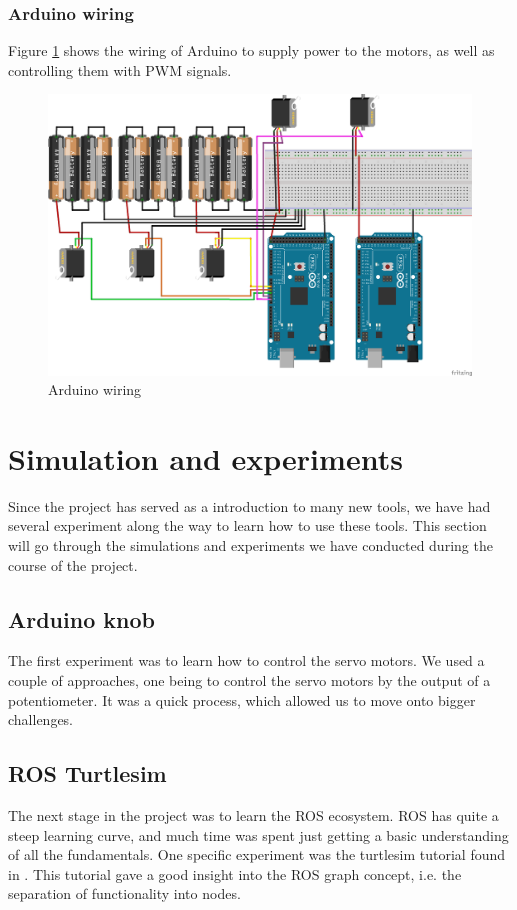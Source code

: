\documentclass[11pt,a4paper, titlepage]{article}
\begin{document}
\newpage
	\subsubsection{Arduino wiring}
	Figure \ref{fig:wiring} shows the wiring of Arduino to supply power to the motors, as well as controlling them with PWM signals.
	
	\begin{figure}[H]
		\centering
		\includegraphics[width=0.8\linewidth]{../Diagrams/Wiring.png}
		\caption{Arduino wiring}
		\label{fig:wiring}
	\end{figure}
	
		
\newpage
	\section{Simulation and experiments}
	\label{simex}
	Since the project has served as a introduction to many new tools, we have had several experiment along the way to learn how to use these tools. This section will go through the simulations and experiments we have conducted during the course of the project.
	
	\subsection{Arduino knob}
	The first experiment was to learn how to control the servo motors. We used a couple of approaches, one being to control the servo motors by the output of a potentiometer. It was a quick process, which allowed us to move onto bigger challenges.
	
	\subsection{ROS Turtlesim}
	The next stage in the project was to learn the ROS ecosystem. ROS has quite a steep learning curve, and much time was spent just getting a basic understanding of all the fundamentals. One specific experiment was the turtlesim tutorial found in \cite{turtle2017}. This tutorial gave a good insight into the ROS graph concept, i.e. the separation of functionality into nodes.
	
\end{document}
